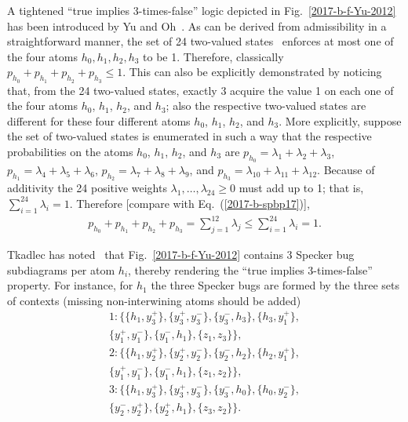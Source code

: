 \documentclass[%
  twocolumn,
 showpacs,
 showkeys,
 preprintnumbers,
 amsmath,amssymb,
 aps,
  pra,
  longbibliography,
 floatfix,
 ]{revtex4-1}
\begin{document}
A tightened ``true implies 3-times-false'' logic depicted in Fig.~\ref{2017-b-f-Yu-2012} has been introduced by Yu and Oh~\cite{Yu-2012}.
As can be derived from admissibility in a straightforward manner,
the set of 24 two-valued states~\cite{tkadlec-priv-2017} enforces at most one of the four atoms $h_0,h_1,h_2,h_3$ to be 1.
Therefore, classically $p_{h_0} + p_{h_1} + p_{h_2} + p_{h_3} \le 1$.
This can also be explicitly demonstrated by  noticing that, from the 24 two-valued states,
exactly 3 acquire the value 1 on each one of  the four atoms
$h_0$,
$h_1$,
$h_2$, and
$h_3$; also the respective two-valued states are different for these four different atoms $h_0$,
$h_1$,
$h_2$, and
$h_3$.
More explicitly, suppose the set of two-valued states is enumerated in such a way that the respective probabilities
on the atoms $h_0$,
$h_1$,
$h_2$, and
$h_3$
are
$p_{h_0}=\lambda_1+\lambda_2+\lambda_3$,
$p_{h_1}=\lambda_4+\lambda_5+\lambda_6$,
$p_{h_2}=\lambda_7+\lambda_8+\lambda_9$, and
$p_{h_3}=\lambda_{10}+\lambda_{11}+\lambda_{12}$.
Because of additivity the 24 positive weights $\lambda_{1},\ldots ,\lambda_{24} \ge 0$
must add up to 1; that is, $\sum_{i=1}^{24} \lambda_{i}=1$.
Therefore [compare with Eq.~(\ref{2017-b-spbp17})],
\begin{equation}
\begin{split}
p_{h_0} + p_{h_1} + p_{h_2} + p_{h_3}
= \sum_{j=1}^{12} \lambda_{j} \le \sum_{i=1}^{24} \lambda_{i}=1
.
\end{split}
\label{2017-b-yo-ohprobs}
\end{equation}

Tkadlec has noted~\cite{tkadlec-priv-2017} that Fig.~\ref{2017-b-f-Yu-2012}
contains 3 Specker bug subdiagrams per atom $h_i$, thereby rendering the ``true implies 3-times-false'' property.
For instance, for $h_1$ the three Specker bugs are formed by the three sets of contexts (missing non-interwining atoms should be added)
\begin{equation}
\begin{split}
1: \{\{h_1, y_3^+ \},\{ y_3^+, y_3^- \},\{ y_3^- , h_3 \},\{ h_3 , y_1^+ \},\\
\{ y_1^+, y_1^- \},\{ y_1^- , h_1 \},\{ z_1 , z_3 \}\},  \\
2: \{\{h_1 , y_2^+ \},\{ y_2^+ , y_2^- \},\{ y_2^-, h_2 \},\{ h_2,y_1^+ \},\\
\{ y_1^+ , y_1^- \},\{ y_1^- , h_1 \},\{ z_1 , z_2  \}\}, \\
3: \{\{h_1 , y_3^+ \},\{ y_3^+ , y_3^- \},\{ y_3^-, h_0 \},\{ h_0 ,y_2^- \},\\
\{ y_2^-, y_2^+ \},\{ y_2^+, h_1 \},\{ z_3 , z_2   \}\}.
\end{split}
\label{2017-b-yo-sb}
\end{equation}
\end{document}
